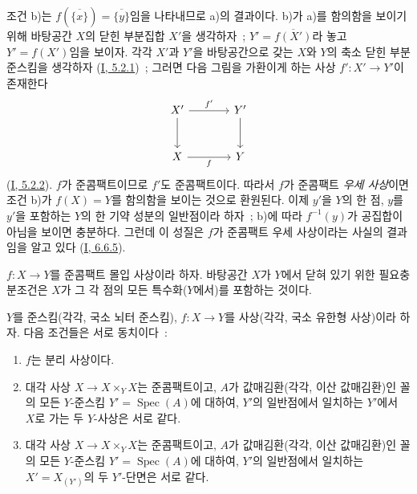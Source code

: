 조건 b)는 $f(\overline{\{x\}})=\overline{\{y\}}$임을 나타내므로 a)의
결과이다. b)가 a)를 함의함을 보이기 위해 바탕공간 $X$의 닫힌 부분집합
$X'$을 생각하자~; $Y'=\overline{f(X')}$라 놓고 $Y'=f(X')$임을
보이자. 각각 $X'$과 $Y'$을 바탕공간으로 갖는 $X$와 $Y$의 축소 닫힌
부분준스킴을 생각하자
(\hyperref[I.5.2.1-ko]{I, 5.2.1})~; 그러면 다음 그림을 가환이게 하는 사상
$f':X'\to Y'$이 존재한다
\[
\begin{tikzcd}[column sep=large,row sep=large]
X' \arrow[r,"f'"] \arrow[d] & Y' \arrow[d] \\
X \arrow[r,"f"'] & Y
\end{tikzcd}
\]
(\hyperref[I.5.2.2-ko]{I, 5.2.2}). $f$가 준콤팩트이므로 $f'$도
준콤팩트이다. 따라서 $f$가 준콤팩트 \emph{우세 사상}이면 조건 b)가
$f(X)=Y$를 함의함을 보이는 것으로 환원된다. 이제 $y'$을 $Y$의 한 점,
$y$를 $y'$을 포함하는 $Y$의 한 기약 성분의 일반점이라 하자~; b)에 따라
$f^{-1}(y)$가 공집합이 아님을 보이면 충분하다. 그런데 이 성질은 $f$가
준콤팩트 우세 사상이라는 사실의 결과임을 알고 있다
(\hyperref[I.6.6.5-ko]{I, 6.6.5}).

\begin{corollary}[7.2.2]
\label{II.7.2.2-ko}
$f:X\to Y$를 준콤팩트 몰입 사상이라 하자. 바탕공간 $X$가 $Y$에서
닫혀 있기 위한 필요충분조건은 $X$가 그 각 점의 모든 특수화($Y$에서)를
포함하는 것이다.
\end{corollary}

\begin{proposition}[7.2.3]
\label{II.7.2.3-ko}
$Y$를 준스킴(각각, 국소 뇌터 준스킴), $f:X\to Y$를
사상(각각, 국소 유한형 사상)이라 하자. 다음 조건들은
서로 동치이다~:
\begin{enumerate}
\item[\rm a)] $f$는 분리 사상이다.
\item[\rm b)] 대각 사상 $X\to X\times_YX$는 준콤팩트이고,
$A$가 값매김환(각각, 이산 값매김환)인 꼴의 모든
$Y$-준스킴 $Y'=\operatorname{Spec}(A)$에 대하여, $Y'$의 일반점에서
일치하는 $Y'$에서 $X$로 가는 두 $Y$-사상은 서로 같다.
\item[\rm c)] 대각 사상 $X\to X\times_YX$는 준콤팩트이고,
$A$가 값매김환(각각, 이산 값매김환)인 꼴의 모든
$Y$-준스킴 $Y'=\operatorname{Spec}(A)$에 대하여, $Y'$의 일반점에서
일치하는 $X'=X_{(Y')}$의 두 $Y'$-단면은 서로 같다.
\end{enumerate}
\end{proposition}

